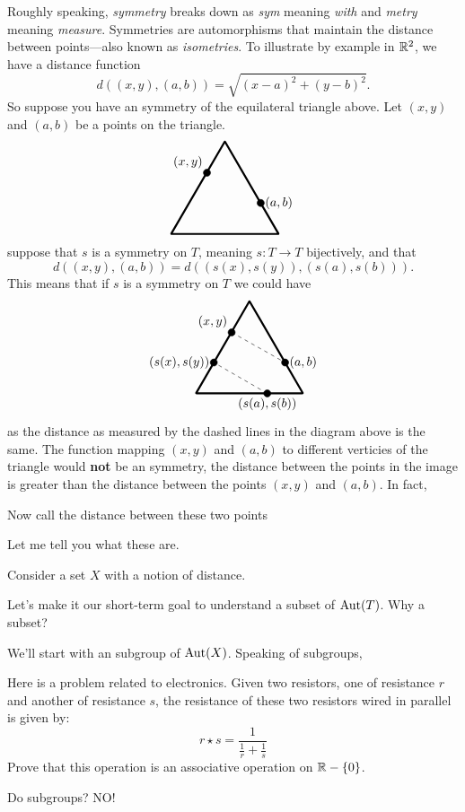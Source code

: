 \documentclass{ximera}
\begin{document}
Roughly speaking, \textit{symmetry} breaks down as \textit{sym}
meaning \textit{with} and \textit{metry} meaning
\textit{measure}. Symmetries are automorphisms that maintain the
distance between points---also known as
\textit{isometries}. To illustrate by example in
$\mathbb R^2$, we have a distance function
\[
d((x,y),(a,b)) = \sqrt{(x-a)^2+(y-b)^2}.
\]
So suppose you have an symmetry of the equilateral triangle above. Let
$(x,y)$ and $(a,b)$ be a points on the triangle.
\[
\begin{tikzpicture}
  \draw[ultra thick,rounded corners=.5] (0,0) -- (3,0) -- (1.5,2.6) -- cycle;
  \draw[fill] (1,1.72) circle (1mm) node[above left] {$(x,y)$};
  \draw[fill] (2.5,0.87) circle (1mm) node[right] {$(a,b)$};
\end{tikzpicture}
\]
suppose that $s$ is a symmetry on $T$, meaning $s:T\to T$
bijectively, and that 
\[
d((x,y),(a,b)) = d((s(x),s(y)),(s(a),s(b))).
\]
This means that if $s$ is a symmetry on $T$ we could have
\[
\begin{tikzpicture}
  \draw[ultra thick,rounded corners=.5] (0,0) -- (3,0) -- (1.5,2.6) -- cycle;
  \draw[fill] (1,1.72) circle (1mm) node[above left] {$(x,y)$};
  \draw[fill] (2.5,0.87) circle (1mm) node[right] {$(a,b)$};

  \draw[dashed] (1,1.72) -- (2.5,0.87);
  
  \draw[fill] (2,0) circle (1mm) node[below] {$(s(a),s(b))$};
  \draw[fill] (.5,0.87) circle (1mm) node[left] {$(s(x),s(y))$};

  \draw[dashed] (2,0) -- (.5,0.87);
\end{tikzpicture}
\]
as the distance as measured by the dashed lines in the diagram above
is the same. The function mapping $(x,y)$ and $(a,b)$ to different
verticies of the triangle would \textbf{not} be an symmetry, the
distance between the points in the image is greater than the distance
between the points $(x,y)$ and $(a,b)$. In fact, 


Now call the distance between these two points


Let me tell you what these are.

\begin{definition}
  Consider a set $X$ with a notion of distance. 
\end{definition}


Let's make it our short-term goal to understand a subset of
$\operatorname{Aut}(T)$. Why a subset?


We'll start with an subgroup of
$\operatorname{Aut}(X)$. Speaking of subgroups, 

\begin{exercise}
Here is a problem related to electronics. Given two resistors, one of
resistance $r$ and another of resistance $s$, the resistance of these
two resistors wired in parallel is given by:
\[
r \star s = \frac{1}{\frac{1}{r} + \frac{1}{s}}
\]
Prove that this operation is an associative operation on $\mathbb R-\{0\}$. 
\end{exercise}


Do subgroups? NO!
\end{document}
